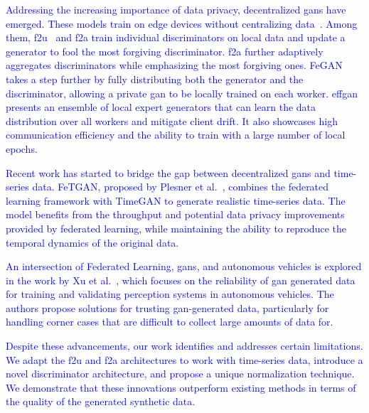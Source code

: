 \textcolor{blue}{
Addressing the increasing importance of data privacy, decentralized \glspl*{gan} have emerged. These models train on edge devices without centralizing data~\cite{hardy_md-gan_2019}. Among them, \gls*{f2u}~\cite{yonetani_decentralized_2019} and \gls*{f2a} train individual discriminators on local data and update a generator to fool the most forgiving discriminator. \gls*{f2a} further adaptively aggregates discriminators while emphasizing the most forgiving ones. FeGAN~\cite{guerraoui_fegan_2020} takes a step further by fully distributing both the generator and the discriminator, allowing a private \gls*{gan} to be locally trained on each worker. \gls*{effgan}~\cite{ekblom_effgan_2022} presents an ensemble of local expert generators that can learn the data distribution over all workers and mitigate client drift. It also showcases high communication efficiency and the ability to train with a large number of local epochs.}

\textcolor{blue}{
Recent work has started to bridge the gap between decentralized \glspl*{gan} and time-series data. FeTGAN, proposed by Plesner et al.~\cite{plesner_fetgan_2021}, combines the federated learning framework with TimeGAN to generate realistic time-series data. The model benefits from the throughput and potential data privacy improvements provided by federated learning, while maintaining the ability to reproduce the temporal dynamics of the original data.}

\textcolor{blue}{
An intersection of Federated Learning, \glspl*{gan}, and autonomous vehicles is explored in the work by Xu et al.~\cite{xu_reliability_2021}, which focuses on the reliability of \gls*{gan} generated data for training and validating perception systems in autonomous vehicles. The authors propose solutions for trusting \gls*{gan}-generated data, particularly for handling corner cases that are difficult to collect large amounts of data for.}

\textcolor{blue}{
Despite these advancements, our work identifies and addresses certain limitations. We adapt the \gls*{f2u} and \gls*{f2a} architectures to work with time-series data, introduce a novel discriminator architecture, and propose a unique normalization technique. We demonstrate that these innovations outperform existing methods in terms of the quality of the generated synthetic data.}
